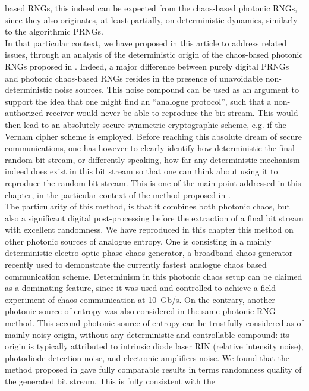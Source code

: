 based RNGs, this indeed can be expected from the chaos-based photonic
RNGs, since they also originates, at least partially, on deterministic
dynamics, similarly to the algorithmic PRNGs.\\ In that particular
context, we have proposed in this article to address related issues,
through an analysis of the deterministic origin of the chaos-based
photonic RNGs proposed in \cite{ultrafast2009}. Indeed, a major
difference between purely digital PRNGs and photonic chaos-based RNGs
resides in the presence of unavoidable non-deterministic noise
sources. This noise compound can be used as an argument to support the
idea that one might find an ``analogue protocol'', such that a
non-authorized receiver would never be able to reproduce the bit
stream. This would then lead to an absolutely secure symmetric
cryptographic scheme, e.g. if the Vernam cipher scheme is
employed. Before reaching this absolute dream of secure
communications, one has however to clearly identify how deterministic
the final random bit stream, or differently speaking, how far any
deterministic mechanism indeed does exist in this bit stream so that
one can think about using it to reproduce the random bit stream. This
is one of the main point addressed in this chapter, in the particular
context of the method proposed in
\cite{ultrafast2009}.\\
The particularity of this method, is that it combines both photonic
chaos, but also a significant digital post-processing before the
extraction of a final bit stream with excellent randomness. We have
reproduced in this chapter this method on other photonic sources of
analogue entropy. One is consisting in a mainly deterministic
electro-optic phase chaos generator, a broadband chaos generator
recently used to demonstrate the currently fastest analogue chaos
based communication scheme. Determinism in this photonic chaos setup
can be claimed as a dominating feature, since it was used and
controlled to achieve a field experiment of chaos communication at
10~Gb/s. On the contrary, another photonic source of entropy was also
considered in the same photonic RNG method. This second photonic
source of entropy can be trustfully considered as of mainly noisy
origin, without any deterministic and controllable compound: its
origin is typically attributed to intrinsic diode laser RIN (relative
intensity noise), photodiode detection noise, and electronic
amplifiers noise. We found that the method proposed in
\cite{ultrafast2009} gave fully comparable results in terms randomness
quality of the generated bit stream. This is fully consistent with the
